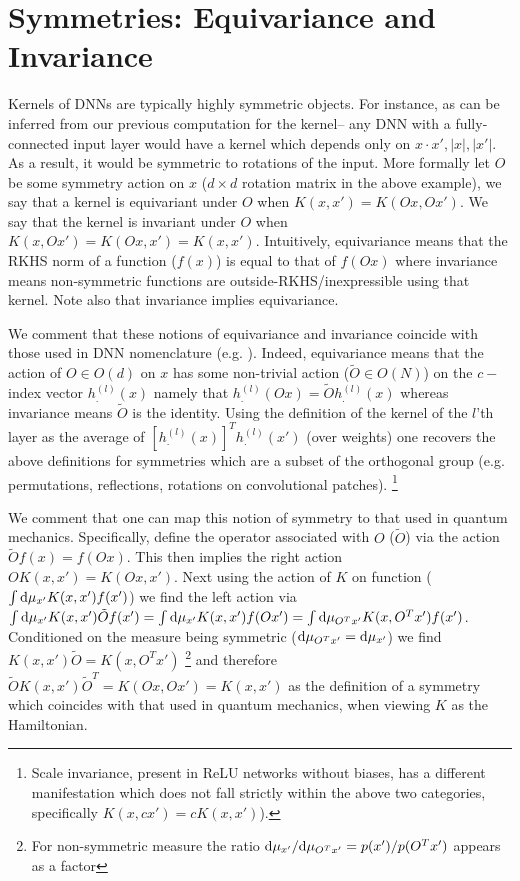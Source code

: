 \section{ Symmetries: Equivariance and Invariance} Kernels of DNNs are typically highly symmetric objects. For instance, as can be inferred from our previous computation for the kernel-- any DNN with a fully-connected input layer would have a kernel which depends only on $x \cdot x',|x|,|x'|$. As a result, it would be symmetric to rotations of the input. More formally let $O$ be some symmetry action on $x$ ($d \times d$ rotation matrix in the above example), we say that a kernel is equivariant under $O$ when $K(x,x')=K(Ox,Ox')$. We say that the kernel is invariant under $O$ when $K(x,Ox')=K(Ox,x')=K(x,x')$. Intuitively, equivariance means that the RKHS norm of a function ($f(x)$) is equal to that of $f(Ox)$ where invariance means non-symmetric functions are outside-RKHS/inexpressible using that kernel. Note also that invariance implies equivariance. 

We comment that these notions of equivariance and invariance coincide with those used in DNN nomenclature (e.g. \cite{novak2018bayesian}). Indeed, equivariance means that the action of $O \in O(d)$ on $x$ has some non-trivial action ($\tilde{O} \in O(N)$) on the $c-$index vector $h^{(l)}_{.}(x)$ namely that $h^{(l)}_{.}(Ox)=\tilde{O}h^{(l)}_{.}(x)$ whereas invariance means $\tilde{O}$ is the identity. Using the definition of the kernel of the $l$'th layer as the average of $[h^{(l)}_{.}(x)]^T h^{(l)}_{.}(x')$ (over weights) one recovers the above definitions for symmetries which are a subset of the orthogonal group (e.g. permutations, reflections, rotations on convolutional patches). \footnote{Scale invariance, present in ReLU networks without biases, has a different manifestation which does not fall strictly within the above two categories, specifically $K(x,cx')=cK(x,x')$).} 

We comment that one can map this notion of symmetry to that used in quantum mechanics. Specifically, define the operator associated with $O$ ($\tilde{O}$) via the action $\tilde{O} f(x)=f(Ox)$. This then implies the right action $OK(x,x')=K(Ox,x')$. Next using the action of $K$ on function ($\int \text{d}\mu_{x'} K(x,x') f(x')$) we find the left action via $\int \text{d}\mu_{x'}K(x,x') \tilde{O}f(x')=\int \text{d}\mu_{x'}K(x,x')f(Ox')=\int \text{d}\mu_{O^T x'}K(x,O^T x')f(x')$. Conditioned on the measure being symmetric ($\text{d}\mu_{O^T x'}=\text{d}\mu_{x'}$) we find $K(x,x')\tilde{O}=K(x,O^T x')$ \footnote{For non-symmetric measure the ratio $\text{d}\mu_{x'}/\text{d}\mu_{O^T x'}=p(x')/p(O^T x')$ appears as a factor} and therefore $\tilde{O} K(x,x') \tilde{O}^T=K(Ox,Ox')=K(x,x')$ as the definition of a symmetry which coincides with that used in quantum mechanics, when viewing $K$ as the Hamiltonian. 

